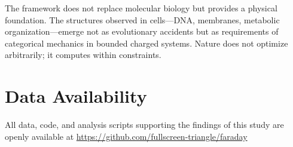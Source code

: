 \documentclass[twocolumn,aps,prb,superscriptaddress,longbibliography,floatfix]{revtex4-2}
\theoremstyle{remark}
\begin{document}
The framework does not replace molecular biology but provides a physical
foundation. The structures observed in cells---DNA, membranes, metabolic
organization---emerge not as evolutionary accidents but as requirements
of categorical mechanics in bounded charged systems. Nature does not
optimize arbitrarily; it computes within constraints.

\section*{Data Availability}

All data, code, and analysis scripts supporting the findings of this study are openly available at \url{https://github.com/fullscreen-triangle/faraday}


\end{document}
